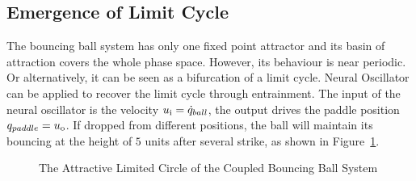 \subsection*{Emergence of Limit Cycle}
The  bouncing ball system has only one fixed point attractor and its basin of attraction covers the whole phase space.
However, its behaviour is near periodic.
Or alternatively, it can be seen as a bifurcation of a limit cycle.
Neural Oscillator can be applied to recover the limit cycle through entrainment.
The input of the neural oscillator is the velocity $u_{\mathrm{i}}=\dot{q}_{ball}$, the output drives the paddle position $q_{paddle}=u_{\mathrm{o}}$.
If dropped from different positions, the ball will maintain its bouncing at the height of $5$ units after several strike,
as shown in Figure~\ref{fig:bb_attractive_circle}.

\begin{figure}[h]
\begin{center}
	
\end{center}
\caption{The Attractive Limited Circle of the Coupled Bouncing Ball System}
\label{fig:bb_attractive_circle}
\end{figure}

